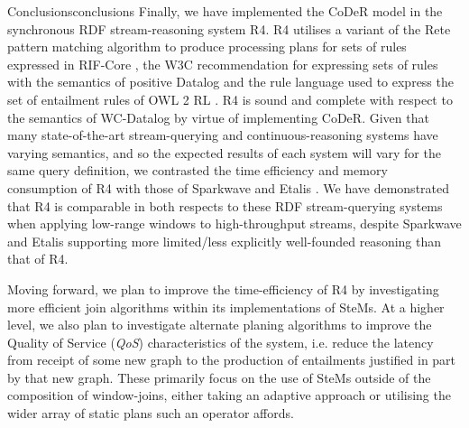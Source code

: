 \begin{nestedsection}{Conclusions}{conclusions}
	Finally, we have implemented the CoDeR model in the synchronous RDF stream-reasoning system R4.
	R4 utilises a variant of the Rete pattern matching algorithm \citep{forgy79} to produce processing plans for sets of rules expressed in RIF-Core \citep{w3crifcore}, the W3C recommendation for expressing sets of rules with the semantics of positive Datalog and the rule language used to express the set of entailment rules of OWL 2 RL \citep{w3cowl2profiles}.
	R4 is sound and complete with respect to the semantics of WC-Datalog by virtue of implementing CoDeR.
	Given that many state-of-the-art stream-querying and continuous-reasoning systems have varying semantics, and so the expected results of each system will vary for the same query definition, we contrasted the time efficiency and memory consumption of R4 with those of Sparkwave \citep{sparkwave} and Etalis \citep{EP-SPARQL}.
	We have demonstrated that R4 is comparable in both respects to these RDF stream-querying systems when applying low-range windows to high-throughput streams, despite Sparkwave and Etalis supporting more limited/less explicitly well-founded reasoning than that of R4.

	Moving forward, we plan to improve the time-efficiency of R4 by investigating more efficient join algorithms within its implementations of SteMs.
	At a higher level, we also plan to investigate alternate planing algorithms to improve the Quality of Service (\emph{QoS}) characteristics of the system, i.e. reduce the latency from receipt of some new graph to the production of entailments justified in part by that new graph.
	These primarily focus on the use of SteMs outside of the composition of window-joins, either taking an adaptive approach \citep{eddies,CACQ,CQELS} or utilising the wider array of static plans such an operator affords.
\end{nestedsection}